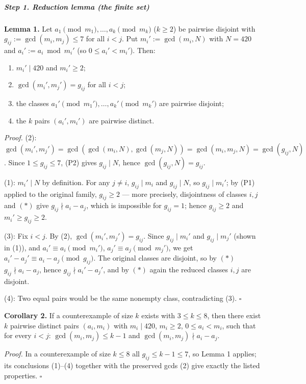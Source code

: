 \documentclass[11pt,a4paper]{article}
\providecommand{\tightlist}{\setlength{\itemsep}{0pt}\setlength{\parskip}{0pt}}
\begin{document}
\subparagraph{Step 1. Reduction lemma (the finite
set)}\label{step-1.-reduction-lemma-the-finite-set}

\textbf{Lemma 1.} Let \(a_1 \pmod{m_1},\dots,a_k \pmod{m_k}\)
(\(k\ge2\)) be pairwise disjoint with \(g_{ij}:=\gcd(m_i,m_j)\le 7\) for
all \(i<j\). Put \(m_i':=\gcd(m_i,N)\) with \(N=420\) and
\(a_i':=a_i \bmod m_i'\) (so \(0\le a_i'<m_i'\)). Then:

\begin{enumerate}
\def\labelenumi{\arabic{enumi}.}
\tightlist
\item
  \(m_i' \mid 420\) and \(m_i'\ge 2\);
\item
  \(\gcd(m_i',m_j')=g_{ij}\) for all \(i<j\);
\item
  the classes \(a_1' \pmod{m_1'},\dots,a_k'\pmod{m_k'}\) are pairwise
  disjoint;
\item
  the \(k\) pairs \((a_i',m_i')\) are pairwise distinct.
\end{enumerate}

\emph{Proof.} (2):
\(\gcd(m_i',m_j')=\gcd(\gcd(m_i,N),\gcd(m_j,N))=\gcd(m_i,m_j,N)=\gcd(g_{ij},N)\).
Since \(1\le g_{ij}\le 7\), (P2) gives \(g_{ij}\mid N\), hence
\(\gcd(g_{ij},N)=g_{ij}\).

(1): \(m_i'\mid N\) by definition. For any \(j\ne i\),
\(g_{ij}\mid m_i\) and \(g_{ij}\mid N\), so \(g_{ij}\mid m_i'\); by (P1)
applied to the original family, \(g_{ij}\ge 2\) --- more precisely,
disjointness of classes \(i,j\) and \((*)\) give
\(g_{ij}\nmid a_i-a_j\), which is impossible for \(g_{ij}=1\); hence
\(g_{ij}\ge2\) and \(m_i'\ge g_{ij}\ge2\).

(3): Fix \(i<j\). By (2), \(\gcd(m_i',m_j')=g_{ij}\). Since
\(g_{ij}\mid m_i'\) and \(g_{ij}\mid m_j'\) (shown in (1)), and
\(a_i'\equiv a_i \pmod{m_i'}\), \(a_j'\equiv a_j\pmod{m_j'}\), we get
\(a_i'-a_j'\equiv a_i-a_j \pmod{g_{ij}}\). The original classes are
disjoint, so by \((*)\) \(g_{ij}\nmid a_i-a_j\), hence
\(g_{ij}\nmid a_i'-a_j'\), and by \((*)\) again the reduced classes
\(i,j\) are disjoint.

(4): Two equal pairs would be the same nonempty class, contradicting
(3). \(\square\)

\textbf{Corollary 2.} If a counterexample of size \(k\) exists with
\(3\le k\le8\), then there exist \(k\) pairwise distinct pairs
\((a_i,m_i)\) with \(m_i\mid 420\), \(m_i\ge2\), \(0\le a_i<m_i\), such
that for every \(i<j\): \(\gcd(m_i,m_j)\le k-1\) and
\(\gcd(m_i,m_j)\nmid a_i-a_j\).

\emph{Proof.} In a counterexample of size \(k\le 8\) all
\(g_{ij}\le k-1\le 7\), so Lemma 1 applies; its conclusions (1)--(4)
together with the preserved gcds (2) give exactly the listed properties.
\(\square\)
\end{document}
